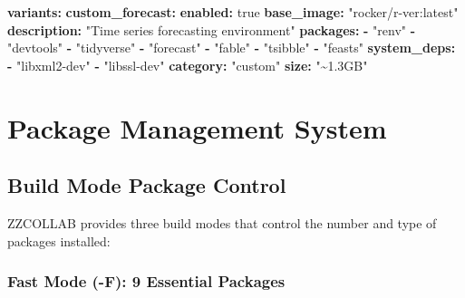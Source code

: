 \documentclass[
]{article}
\newenvironment{Shaded}{\begin{snugshade}}{\end{snugshade}}
\newcommand{\AttributeTok}[1]{\textcolor[rgb]{0.13,0.29,0.53}{#1}}
\newcommand{\CharTok}[1]{\textcolor[rgb]{0.31,0.60,0.02}{#1}}
\newcommand{\FunctionTok}[1]{\textcolor[rgb]{0.13,0.29,0.53}{\textbf{#1}}}
\newcommand{\KeywordTok}[1]{\textcolor[rgb]{0.13,0.29,0.53}{\textbf{#1}}}
\newcommand{\StringTok}[1]{\textcolor[rgb]{0.31,0.60,0.02}{#1}}
\begin{document}
\begin{Shaded}
\begin{Highlighting}[]
\FunctionTok{variants}\KeywordTok{:}
\AttributeTok{  }\FunctionTok{custom\_forecast}\KeywordTok{:}
\AttributeTok{    }\FunctionTok{enabled}\KeywordTok{:}\AttributeTok{ }\CharTok{true}
\AttributeTok{    }\FunctionTok{base\_image}\KeywordTok{:}\AttributeTok{ }\StringTok{"rocker/r{-}ver:latest"}
\AttributeTok{    }\FunctionTok{description}\KeywordTok{:}\AttributeTok{ }\StringTok{"Time series forecasting environment"}
\AttributeTok{    }\FunctionTok{packages}\KeywordTok{:}
\AttributeTok{      }\KeywordTok{{-}}\AttributeTok{ }\StringTok{"renv"}
\AttributeTok{      }\KeywordTok{{-}}\AttributeTok{ }\StringTok{"devtools"}
\AttributeTok{      }\KeywordTok{{-}}\AttributeTok{ }\StringTok{"tidyverse"}
\AttributeTok{      }\KeywordTok{{-}}\AttributeTok{ }\StringTok{"forecast"}
\AttributeTok{      }\KeywordTok{{-}}\AttributeTok{ }\StringTok{"fable"}
\AttributeTok{      }\KeywordTok{{-}}\AttributeTok{ }\StringTok{"tsibble"}
\AttributeTok{      }\KeywordTok{{-}}\AttributeTok{ }\StringTok{"feasts"}
\AttributeTok{    }\FunctionTok{system\_deps}\KeywordTok{:}
\AttributeTok{      }\KeywordTok{{-}}\AttributeTok{ }\StringTok{"libxml2{-}dev"}
\AttributeTok{      }\KeywordTok{{-}}\AttributeTok{ }\StringTok{"libssl{-}dev"}
\AttributeTok{    }\FunctionTok{category}\KeywordTok{:}\AttributeTok{ }\StringTok{"custom"}
\AttributeTok{    }\FunctionTok{size}\KeywordTok{:}\AttributeTok{ }\StringTok{"\textasciitilde{}1.3GB"}
\end{Highlighting}
\end{Shaded}

\section{Package Management System}\label{package-management-system-1}

\subsection{Build Mode Package
Control}\label{build-mode-package-control}

ZZCOLLAB provides three build modes that control the number and type of
packages installed:

\subsubsection{Fast Mode (-F): 9 Essential
Packages}\label{fast-mode--f-9-essential-packages}
\end{document}
